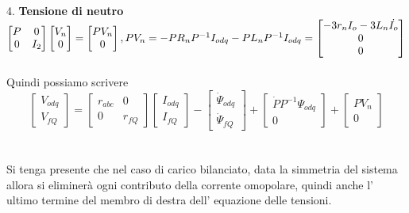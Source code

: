 \documentclass[Lau,noexaminfo]{sapthesis}
\begin{document}
	4. \textbf{Tensione di neutro}\\
	$\begin{bmatrix}
	P & 0\\
	0 & I_2
	\end{bmatrix}
	\begin{bmatrix}
		V_n\\
		0
	\end{bmatrix}=
	\begin{bmatrix}
	PV_n\\
	0
	\end{bmatrix},\\
	PV_n=-PR_nP^{-1}I_{odq}-PL_nP^{-1}I_{odq}=
	\begin{bmatrix}
		-3r_nI_o-3L_n\dot{I_o}\\
		0\\
		0\\
	\end{bmatrix}$\\\\
	Quindi possiamo scrivere\\
	\begin{equation}
	\begin{bmatrix}
	V_{odq}\\
	V_{fQ}
	\end{bmatrix}=
	\begin{bmatrix}
	r_{abc} & 0\\
	0 & r_{fQ}
	\end{bmatrix}
	\begin{bmatrix}
	I_{odq}\\
	I_{fQ}
	\end{bmatrix}-
	\begin{bmatrix}
	\dot{\Psi}_{odq}\\
	\dot{\Psi}_{fQ}
	\end{bmatrix}+
	\begin{bmatrix}
	\dot{P}P^{-1}\Psi_{odq}\\
	0
	\end{bmatrix}+
	\begin{bmatrix}
	PV_n\\
	0
	\end{bmatrix}
	\end{equation}\\\\
	Si tenga presente che nel caso di carico bilanciato, data la simmetria del sistema allora si eliminerà ogni contributo della corrente omopolare, quindi anche l' ultimo termine del membro di destra dell' equazione delle tensioni.
\end{document}
